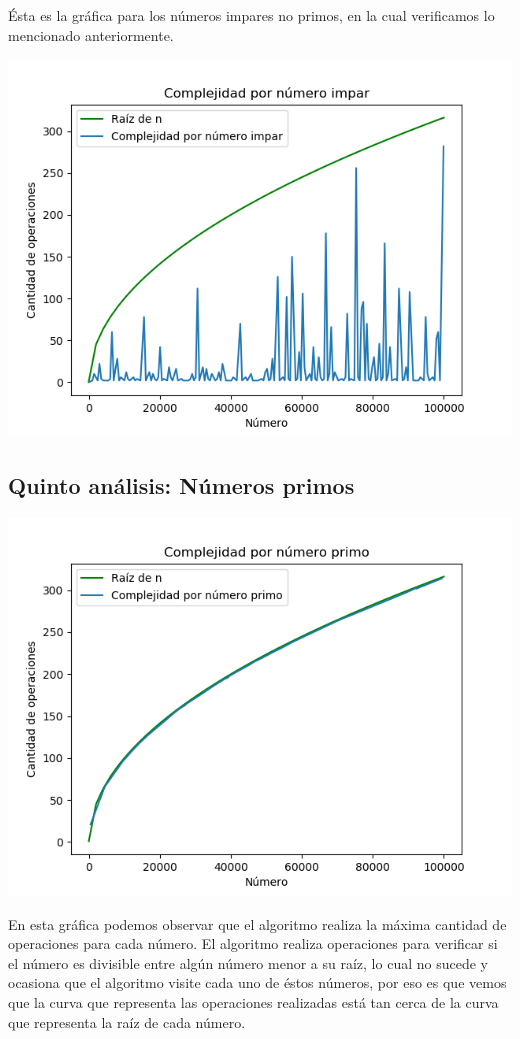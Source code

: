 \newpage \'Esta es la gr\'afica para los n\'umeros impares no primos, en la cual verificamos lo mencionado anteriormente.
\begin{center}
	\includegraphics[scale=0.6]{NumerosImpares.png}
\end{center}



\subsection{Quinto an\'alisis: N\'umeros primos}
\begin{center}
	\includegraphics[scale=0.6]{NumerosPrimos.png}
\end{center}
En esta gr\'afica podemos observar que el algoritmo realiza la m\'axima cantidad de operaciones para cada n\'umero. El algoritmo realiza operaciones para verificar si el n\'umero es divisible entre alg\'un n\'umero menor a su ra\'iz, lo cual no sucede y ocasiona que el algoritmo visite cada uno de \'estos n\'umeros, por eso es que vemos que la curva que representa las operaciones realizadas est\'a tan cerca de la curva que representa la ra\'iz de cada n\'umero.

